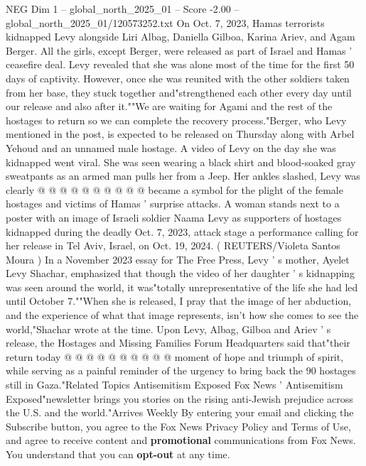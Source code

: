 \begin{textsample}{NEG Dim 1 – global\_north\_2025\_01 – Score -2.00 – global\_north\_2025\_01/120573252.txt}  \label{ex:f1_neg_083}
On Oct. 7, 2023, Hamas terrorists kidnapped Levy alongside Liri Albag, Daniella Gilboa, Karina Ariev, and Agam Berger.
All the girls, except Berger, were released as part of Israel and Hamas ' ceasefire deal.
Levy revealed that she was alone most of the time for the first 50 days of captivity.
However, once she was reunited with the other soldiers taken from her base, they stuck together and"strengthened each other every day until our release and also after it.""We are waiting for Agami and the rest of the hostages to return so we can complete the recovery process."Berger, who Levy mentioned in the post, is expected to be released on Thursday along with Arbel Yehoud and an unnamed male hostage.
A video of Levy on the day she was kidnapped went viral.
She was seen wearing a black shirt and blood-soaked gray sweatpants as an armed man pulls her from a Jeep.
Her ankles slashed, Levy was clearly @ @ @ @ @ @ @ @ @ @ became a symbol for the plight of the female hostages and victims of Hamas ' surprise attacks.
A woman stands next to a poster with an image of Israeli soldier Naama Levy as supporters of hostages kidnapped during the deadly Oct. 7, 2023, attack stage a performance calling for her release in Tel Aviv, Israel, on Oct. 19, 2024. ( REUTERS/Violeta Santos Moura ) In a November 2023 essay for The Free Press, Levy ' s mother, Ayelet Levy Shachar, emphasized that though the video of her daughter ' s kidnapping was seen around the world, it was"totally unrepresentative of the life she had led until October 7.""When she is released, I pray that the image of her abduction, and the experience of what that image represents, isn't how she comes to see the world,"Shachar wrote at the time.
Upon Levy, Albag, Gilboa and Ariev ' s release, the Hostages and Missing Families Forum Headquarters said that"their return today @ @ @ @ @ @ @ @ @ @ moment of hope and triumph of spirit, while serving as a painful reminder of the urgency to bring back the 90 hostages still in Gaza."Related Topics Antisemitism Exposed Fox News ' Antisemitism Exposed"newsletter brings you stories on the rising anti-Jewish prejudice across the U.S. and the world."Arrives Weekly By entering your email and clicking the Subscribe button, you agree to the Fox News Privacy Policy and Terms of Use, and agree to receive content and \textbf{promotional} communications from Fox News.
You understand that you can \textbf{opt-out} at any time.

\end{textsample}
